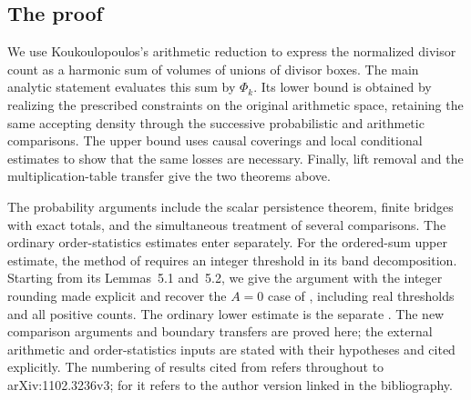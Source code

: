 \subsection{The proof}

We use Koukoulopoulos's arithmetic reduction
\cite[Theorem~1.7]{Kouk} to express the normalized divisor count as a
harmonic sum of volumes of unions of divisor boxes. The main analytic
statement evaluates this sum by $\Phi_k$. Its lower bound is obtained
by realizing the prescribed constraints on the original arithmetic
space, retaining the same accepting density through the successive
probabilistic and arithmetic comparisons. The upper bound uses causal
coverings and local conditional estimates to show that the same losses
are necessary. Finally, lift removal and the multiplication-table
transfer give the two theorems above.

The probability arguments include the scalar persistence theorem,
finite bridges with exact totals, and the simultaneous treatment of
several comparisons. The ordinary order-statistics estimates enter
separately. For the ordered-sum upper estimate, the method of
\cite[Lemma~5.3]{KoukLocal} requires an integer threshold in its band
decomposition. Starting from its Lemmas~5.1 and~5.2, we give the argument
with the integer rounding made explicit and recover the $A=0$ case of
\cite[Lemma~5.5]{Kouk}, including real thresholds and all positive counts.
The ordinary lower estimate is the separate
\cite[Lemma~8.3]{Kouk}.
The new comparison arguments and boundary transfers are proved here;
the external arithmetic and order-statistics inputs are stated with
their hypotheses and cited explicitly.
The numbering of results cited from \cite{Kouk} refers throughout to
arXiv:1102.3236v3; for \cite{KoukLocal} it refers to the author version
linked in the bibliography.
